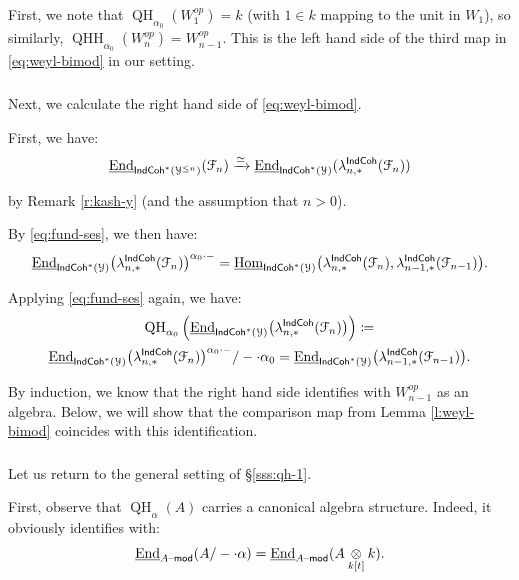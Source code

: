 \documentclass[reqno,11pt]{amsart}
\numberwithin{equation}{subsection}
\theoremstyle{remark}
\newcommand{\xar}[1]{\xrightarrow{#1}}
\newcommand{\rar}[1]{\xar{#1}}
\newcommand{\isom}{\rar{\simeq}}
\newcommand{\sF}{{\EuScript F}}
\newcommand{\sY}{{\EuScript Y}}
\newcommand{\on}{\operatorname}
\newcommand{\ul}{\underline}
\newcommand{\mathendash}{\text{\textendash}}
\newcommand{\End}{\on{End}}
\newcommand{\Hom}{\on{Hom}}
\renewcommand{\mod}{\mathendash\mathsf{mod}}
\newcommand{\IndCoh}{\mathsf{IndCoh}}
\begin{document}
First, we note that $\on{QH}_{\alpha_0}(W_1^{op}) = k$ (with $1 \in k$ mapping to the
unit in $W_1$), so similarly, 
$\on{QHH}_{\alpha_0}(W_n^{op}) = W_{n-1}^{op}$. This is the left hand side of
the third map in \eqref{eq:weyl-bimod} in our setting.

\subsubsection{}

Next, we calculate the right hand side of \eqref{eq:weyl-bimod}.

First, we have:
%
\[
\ul{\End}_{\IndCoh^*(\sY^{\leq n})}(\sF_n) \isom 
\ul{\End}_{\IndCoh^*(\sY)}(\lambda_{n,*}^{\IndCoh}(\sF_n))
\]

\noindent by Remark \ref{r:kash-y} (and the assumption that $n>0$).

By \eqref{eq:fund-ses}, we then have:
%
\[
\ul{\End}_{\IndCoh^*(\sY)}\big(\lambda_{n,*}^{\IndCoh}(\sF_n)\big)^{\alpha_0\cdot-} = 
\ul{\Hom}_{\IndCoh^*(\sY)}\big(\lambda_{n,*}^{\IndCoh}(\sF_n),
\lambda_{n-1,*}^{\IndCoh}(\sF_{n-1})\big). 
\]

\noindent Applying \eqref{eq:fund-ses} again, we have:
%
\begin{equation}\label{eq:qh-end}
\begin{gathered}
\on{QH}_{\alpha_0}\Big(\ul{\End}_{\IndCoh^*(\sY)}\big(\lambda_{n,*}^{\IndCoh}(\sF_n)\big)\Big) 
\coloneqq \\
\ul{\End}_{\IndCoh^*(\sY)}\big(\lambda_{n,*}^{\IndCoh}(\sF_n)\big)^{\alpha_0\cdot-}/-\cdot\alpha_0 =
\ul{\End}_{\IndCoh^*(\sY)}\big(\lambda_{n-1,*}^{\IndCoh}(\sF_{n-1})\big).
\end{gathered}
\end{equation}

By induction, we know that the right hand side identifies with 
$W_{n-1}^{op}$ as an algebra. Below, we will show that the
comparison map from Lemma \ref{l:weyl-bimod} coincides with this
identification.

\subsubsection{}

Let us return to the general setting of \S \ref{sss:qh-1}.

First, observe that $\on{QH}_{\alpha}(A)$ carries a canonical algebra structure.
Indeed, it obviously identifies with:
%
\[
\ul{\End}_{A\mod}(A/-\cdot\alpha) = 
\ul{\End}_{A\mod}(A \underset{k[t]}{\otimes} k).
\]
\end{document}
